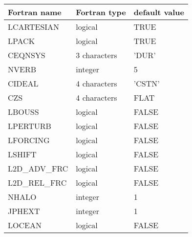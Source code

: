 \begin{center}
\begin{tabular} {|l|l|l|}
\hline
Fortran name & Fortran type & default value \\
\hline
LCARTESIAN & logical     & TRUE  \\
LPACK      & logical     & TRUE  \\
CEQNSYS    & 3 characters& 'DUR'   \\
NVERB      & integer     & 5     \\
CIDEAL     & 4 characters& 'CSTN'  \\
CZS        & 4 characters& FLAT  \\
LBOUSS     & logical     & FALSE \\
LPERTURB   & logical     & FALSE \\
LFORCING   & logical     & FALSE \\
LSHIFT     & logical     & FALSE \\
L2D\_ADV\_FRC  & logical     & FALSE \\
L2D\_REL\_FRC  & logical     & FALSE \\
NHALO      & integer        & 1      \\
JPHEXT     & integer        & 1      \\
LOCEAN     & logical        & FALSE \\
\hline
\end{tabular}
\end{center}

